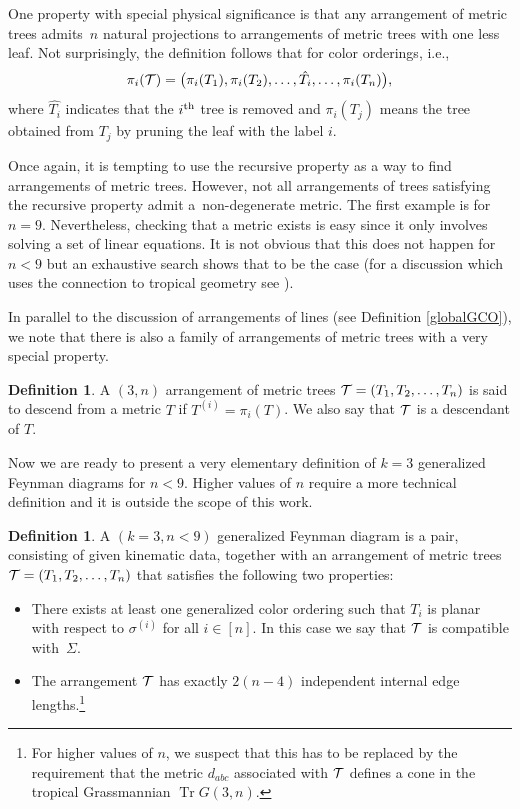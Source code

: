 \documentclass[pdftex]{sigma}
\theoremstyle{definition}
\newtheorem{defn}[thm]{Definition}
\def \be {\begin{equation}}
\def \ee {\end{equation}}
\def \be {\begin{equation}}
\numberwithin{equation}{section}
\begin{document}
One property with special physical significance is that any arrangement of metric trees admits~$n$ natural projections to arrangements of metric trees with one less leaf. Not surprisingly, the definition follows that for color orderings, i.e.,
%
\be
\label{projectioncFD}
\pi_i({\cal T}) = \big( \pi_i(T_1),\pi_i(T_2),\dots ,\hat{T_i} ,\dots ,\pi_i(T_n) \big),
\ee
%
where $\hat{T_i}$ indicates that the $i^{\rm th}$ tree is removed and $\pi_i(T_j)$ means the tree obtained from $T_j$ by pruning the leaf with the label $i$.


Once again, it is tempting to use the recursive property as a way to find arrangements of metric trees. However, not all arrangements of trees satisfying the recursive property admit a~non-degenerate metric. The first example is for $n=9$. Nevertheless, checking that a metric exists is easy since it only involves solving a set of linear equations. It is not obvious that this does not happen for $n<9$ but an exhaustive search shows that to be the case (for a discussion which uses the connection to tropical geometry see \cite{herrmann2008draw}).

In parallel to the discussion of arrangements of lines (see Definition \ref{globalGCO}), we note that there is also a family of arrangements of metric trees with a very special property.

\begin{defn}\label{globalGFD}
A $(3,n)$ arrangement of metric trees ${\cal T} = ( T_1,T_2,\dots ,T_n )$ is said to descend from a metric $T$ if $T^{(i)}=\pi_i(T)$. We also say that ${\cal T}$ is a descendant of $T$.
\end{defn}

Now we are ready to present a very elementary definition of $k=3$ generalized Feynman diagrams for $n<9$. Higher values of $n$ require a more technical definition and it is outside the scope of this work.

\begin{defn}\label{defGFD}
A $(k=3, n<9)$ generalized Feynman diagram is a pair, consisting of given kinematic data, together with an arrangement of metric trees
${\cal T} = ( T_1,T_2,\dots ,T_n )$ that satisfies the following two properties:
\begin{itemize}\itemsep=0pt
 \item There exists at least one generalized color ordering  such that $T_i$ is planar with respect to $\sigma^{(i)}$ for all $i \in [n]$. In this case we say that ${\cal T}$ is compatible with~$\Sigma$.
 \item The arrangement ${\cal T}$ has exactly $2(n-4)$ independent internal edge lengths.\footnote{For higher values of $n$, we suspect that this has to be replaced by the requirement that the metric $d_{abc}$ associated with ${\cal T}$ defines a cone in the tropical Grassmannian $\operatorname{Tr} G(3,n)$.}
\end{itemize}
\end{defn}
\end{document}
